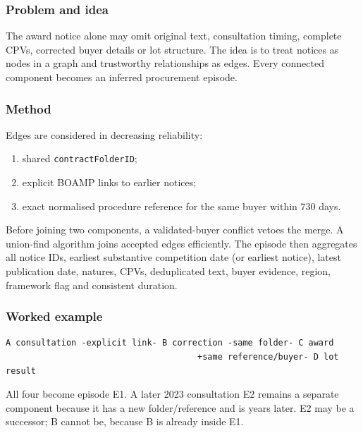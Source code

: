 \subsubsection{Problem and idea}\label{problem-and-idea}

The award notice alone may omit original text, consultation timing,
complete CPVs, corrected buyer details or lot structure. The idea is to
treat notices as nodes in a graph and trustworthy relationships as
edges. Every connected component becomes an inferred procurement
episode.

\subsubsection{Method}\label{method}

Edges are considered in decreasing reliability:

\begin{enumerate}
\def\labelenumi{\arabic{enumi}.}
\tightlist
\item
  shared \texttt{contractFolderID};
\item
  explicit BOAMP links to earlier notices;
\item
  exact normalised procedure reference for the same buyer within 730
  days.
\end{enumerate}

Before joining two components, a validated-buyer conflict vetoes the
merge. A union-find algorithm joins accepted edges efficiently. The
episode then aggregates all notice IDs, earliest substantive competition
date (or earliest notice), latest publication date, natures, CPVs,
deduplicated text, buyer evidence, region, framework flag and consistent
duration.

\subsubsection{Worked example}\label{worked-example}

\begin{verbatim}
A consultation -explicit link- B correction -same folder- C award
                                      +same reference/buyer- D lot result
\end{verbatim}

All four become episode E1. A later 2023 consultation E2 remains a
separate component because it has a new folder/reference and is years
later. E2 may be a successor; B cannot be, because B is already inside
E1.

